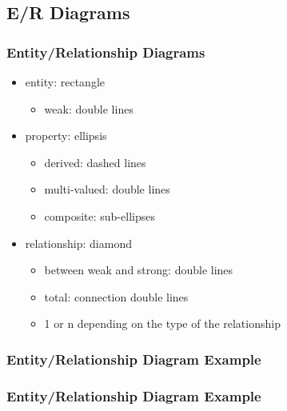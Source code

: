 \documentclass[dvipsnames]{beamer}
\begin{document}
\subsection{E/R Diagrams}

\begin{frame}
  \frametitle{Entity/Relationship Diagrams}

  \begin{itemize}
    \item entity: rectangle
    \begin{itemize}
      \item weak: double lines
    \end{itemize}

    \pause
    \item property: ellipsis
    \begin{itemize}
      \item derived: dashed lines
      \item multi-valued: double lines
      \item composite: sub-ellipses
    \end{itemize}

    \pause
    \item relationship: diamond
    \begin{itemize}
      \item between weak and strong: double lines
      \item total: connection double lines
      \item 1 or n depending on the type of the relationship
    \end{itemize}
 \end{itemize}
\end{frame}

\begin{frame}
  \frametitle{Entity/Relationship Diagram Example}

  \begin{example}
    \begin{center}
    \end{center}
  \end{example}
\end{frame}

\begin{frame}
  \frametitle{Entity/Relationship Diagram Example}

  \begin{example}
    \begin{center}
    \end{center}
  \end{example}
\end{frame}
\end{document}

